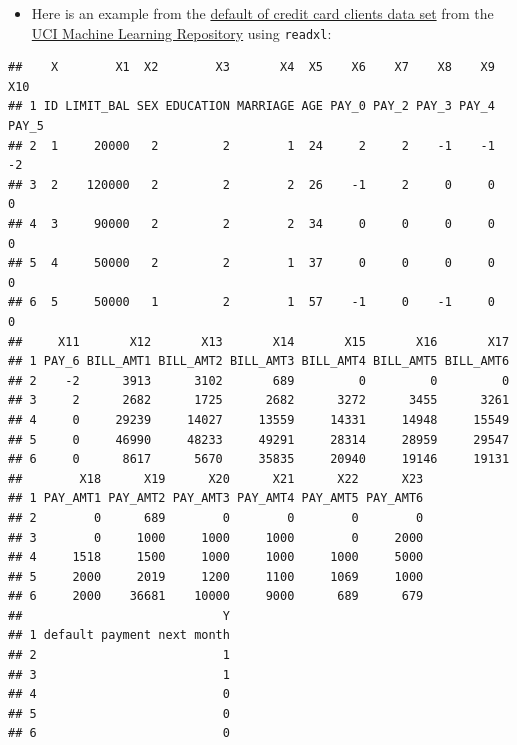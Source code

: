 \documentclass[]{book}
\newenvironment{Shaded}{\begin{snugshade}}{\end{snugshade}}
\newcommand{\KeywordTok}[1]{\textcolor[rgb]{0.13,0.29,0.53}{\textbf{{#1}}}}
\newcommand{\StringTok}[1]{\textcolor[rgb]{0.31,0.60,0.02}{{#1}}}
\newcommand{\CommentTok}[1]{\textcolor[rgb]{0.56,0.35,0.01}{\textit{{#1}}}}
\newcommand{\NormalTok}[1]{{#1}}
\providecommand{\tightlist}{%
  \setlength{\itemsep}{0pt}\setlength{\parskip}{0pt}}
\begin{document}
\begin{itemize}
\tightlist
\item
  Here is an example from the
  \href{http://archive.ics.uci.edu/ml/datasets/default+of+credit+card+clients}{default
  of credit card clients data set} from the
  \href{http://archive.ics.uci.edu/ml/index.html}{UCI Machine Learning
  Repository} using \texttt{readxl}:
\end{itemize}

\begin{Shaded}
\end{Shaded}

\begin{verbatim}
##    X        X1  X2        X3       X4  X5    X6    X7    X8    X9   X10
## 1 ID LIMIT_BAL SEX EDUCATION MARRIAGE AGE PAY_0 PAY_2 PAY_3 PAY_4 PAY_5
## 2  1     20000   2         2        1  24     2     2    -1    -1    -2
## 3  2    120000   2         2        2  26    -1     2     0     0     0
## 4  3     90000   2         2        2  34     0     0     0     0     0
## 5  4     50000   2         2        1  37     0     0     0     0     0
## 6  5     50000   1         2        1  57    -1     0    -1     0     0
##     X11       X12       X13       X14       X15       X16       X17
## 1 PAY_6 BILL_AMT1 BILL_AMT2 BILL_AMT3 BILL_AMT4 BILL_AMT5 BILL_AMT6
## 2    -2      3913      3102       689         0         0         0
## 3     2      2682      1725      2682      3272      3455      3261
## 4     0     29239     14027     13559     14331     14948     15549
## 5     0     46990     48233     49291     28314     28959     29547
## 6     0      8617      5670     35835     20940     19146     19131
##        X18      X19      X20      X21      X22      X23
## 1 PAY_AMT1 PAY_AMT2 PAY_AMT3 PAY_AMT4 PAY_AMT5 PAY_AMT6
## 2        0      689        0        0        0        0
## 3        0     1000     1000     1000        0     2000
## 4     1518     1500     1000     1000     1000     5000
## 5     2000     2019     1200     1100     1069     1000
## 6     2000    36681    10000     9000      689      679
##                            Y
## 1 default payment next month
## 2                          1
## 3                          1
## 4                          0
## 5                          0
## 6                          0
\end{verbatim}
\end{document}
